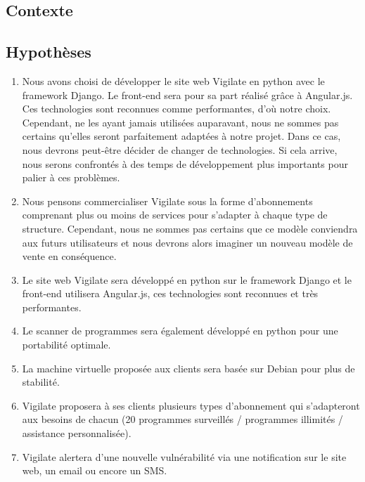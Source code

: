 \textcolor{myBlue}{\chapter{Contexte}}
\section{Hypothèses}
\begin{enumerate}
\item Nous avons choisi de développer le site web Vigilate en python avec le framework Django. Le front-end sera pour sa part réalisé grâce à Angular.js. Ces technologies sont reconnues comme performantes, d'où notre choix. Cependant, ne les ayant jamais utilisées auparavant, nous ne sommes pas certains qu'elles seront parfaitement adaptées à notre projet. Dans ce cas, nous devrons peut-être décider de changer de technologies. Si cela arrive, nous serons confrontés à des temps de développement plus importants pour palier à ces problèmes.\\
\item Nous pensons commercialiser Vigilate sous la forme d'abonnements comprenant plus ou moins de services pour s'adapter à chaque type de structure. Cependant, nous ne sommes pas certains que ce modèle conviendra aux futurs utilisateurs et nous devrons alors imaginer un nouveau modèle de vente en conséquence.\\
\item Le site web Vigilate sera développé en python sur le framework Django et le front-end utilisera Angular.js, ces technologies sont reconnues et très performantes.\\
\item Le scanner de programmes sera également développé en python pour une portabilité optimale.\\
\item La machine virtuelle proposée aux clients sera basée sur Debian pour plus de stabilité.\\
\item Vigilate proposera à ses clients plusieurs types d'abonnement qui s'adapteront aux besoins de chacun (20 programmes surveillés / programmes illimités / assistance personnalisée).\\
\item Vigilate alertera d'une nouvelle vulnérabilité via une notification sur le site web, un email ou encore un SMS.
\end{enumerate}

